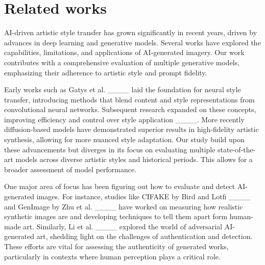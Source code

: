 \section{Related works}
AI-driven artistic style transfer has grown significantly in recent years, driven by advances in deep learning and generative models. Several works have explored the capabilities, limitations, and applications of AI-generated imagery. Our work contributes with a comprehensive evaluation of multiple generative models, emphasizing their adherence to artistic style and prompt fidelity.

Early works such as Gatys et al. ____ laid the foundation for neural style transfer, introducing methods that blend content and style representations from convolutional neural networks. Subsequent research expanded on these concepts, improving efficiency and control over style application ____. More recently diffusion-based models have demonstrated superior results in high-fidelity artistic synthesis, allowing for more nuanced style adaptation. Our study build upon these advancements but diverges in its focus on evaluating multiple state-of-the-art models across diverse artistic styles and historical periods. This allows for a broader assessment of model performance. 

One major area of focus has been figuring out how to evaluate and detect AI-generated images. For instance, studies like CIFAKE by Bird and Lotfi ____ and GenImage by Zhu et al. ____ have worked on measuring how realistic synthetic images are and developing techniques to tell them apart form human-made art. Similarly, Li et al. ____ explored the world of adversarial AI-generated art, shedding light on the challenges of authentication and detection. These efforts are vital for assessing the authenticity of generated works, particularly in contexts where human perception plays a critical role. 

